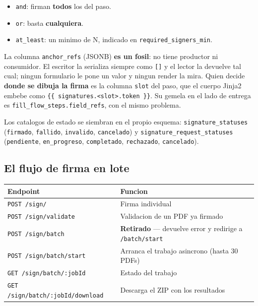 \documentclass[11pt,a4paper,oneside]{report}
\newcommand{\rt}[1]{\texttt{#1}}
\begin{document}
\begin{itemize}[leftmargin=1.4em]
  \item \rt{and}: firman \textbf{todos} los del paso.
  \item \rt{or}: basta \textbf{cualquiera}.
  \item \rt{at\_least}: un minimo de N, indicado en \rt{required\_signers\_min}.
\end{itemize}

La columna \rt{anchor\_refs} (JSONB) \textbf{es un fosil}: no tiene productor ni consumidor. El
escritor la serializa siempre como \rt{[]} y el lector la devuelve tal cual; ningun formulario le
pone un valor y ningun render la mira. Quien decide \textbf{donde se dibuja la firma} es la
columna \rt{slot} del paso, que el cuerpo Jinja2 embebe como
\rt{\{\{ signatures.<slot>.token \}\}}. Su gemela en el lado de entrega es
\rt{fill\_flow\_steps.field\_refs}, con el mismo problema.

Los catalogos de estado se siembran en el propio esquema:
\rt{signature\_statuses} (\rt{firmado}, \rt{fallido}, \rt{invalido}, \rt{cancelado}) y
\rt{signature\_request\_statuses} (\rt{pendiente}, \rt{en\_progreso}, \rt{completado},
\rt{rechazado}, \rt{cancelado}).

\subsection{El flujo de firma en lote}

\begin{center}
\footnotesize
\begin{tabularx}{\textwidth}{@{}P{5.4cm}L@{}}
\toprule
\textbf{Endpoint} & \textbf{Funcion} \\
\midrule
\rt{POST /sign/}                       & Firma individual \\
\rt{POST /sign/validate}               & Validacion de un PDF ya firmado \\
\rt{POST /sign/batch}                  & \textbf{Retirado} --- devuelve error y redirige a \rt{/batch/start} \\
\rt{POST /sign/batch/start}            & Arranca el trabajo asincrono (hasta 30 PDFs) \\
\rt{GET /sign/batch/:jobId}            & Estado del trabajo \\
\rt{GET /sign/batch/:jobId/download}   & Descarga el ZIP con los resultados \\
\bottomrule
\end{tabularx}
\end{center}
\end{document}
